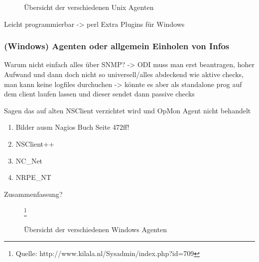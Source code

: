 \begin{figure}[ht]
	\centering
		\caption{Übersicht der verschiedenen Unix Agenten\protect\footnotemark}
		\label{nix-agents}
\end{figure}

Leicht programmierbar -> perl
Extra Plugins für Windows

\subsubsection{(Windows) Agenten oder allgemein Einholen von Infos}
Warum nicht einfach alles über SNMP? -> ODI muss man erst beantragen, hoher Aufwand und dann doch nicht so universell/alles abdeckend wie aktive checks, man kann keine logfiles durchuchen -> könnte es aber als standalone prog auf dem client laufen lassen und dieser sendet dann passive checks

Sagen das auf alten NSClient verzichtet wird und OpMon Agent nicht behandelt
\begin{enumerate}
\item Bilder ausm Nagios Buch Seite 472ff!
\item NSClient++
\item NC\_Net
\item NRPE\_NT
\end{enumerate}

Zusammenfassung?

\begin{figure}[ht]
	\centering
		\caption{Übersicht der verschiedenen Windows Agenten}\footnote{Quelle: http://www.kilala.nl/Sysadmin/index.php?id=709}
		\label{win-agents}
\end{figure}

